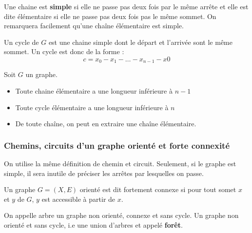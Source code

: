 \begin{definition}
    Une chaine est \textbf{simple} si elle ne passe pas deux fois par le même arrête et elle est dite élémentaire si elle ne passe pas deux fois pas le même sommet.
    On remarquera facilement qu'une chaîne élémentaire est simple.
\end{definition}

\begin{definition}[Cycle]
    Un cycle de $G$ est une chaine simple dont le départ et l'arrivée sont le même sommet. Un cycle est donc de la forme :
        \[ c = x_0 - x_1 - \dots - x_{n-1} - x0 \] 
\end{definition}

\begin{theorem}
    Soit $G$ un graphe.
    \begin{itemize}
        \item Toute chaine élémentaire a une longueur inférieure à $n-1$
        \item Toute cycle élémentaire a une longueur inférieure à $n$
        \item De toute chaîne, on peut en extraire une chaîne élémentaire.
    \end{itemize}
\end{theorem}


\subsubsection{Chemins, circuits d'un graphe orienté et forte connexité}

On utilise la même définition de chemin et circuit. Seulement, si le graphe est simple, il sera inutile de préciser les arrêtes par lesquelles on passe.

\begin{definition}
    Un graphe $G = (X,E)$ orienté est dit fortement connexe si pour tout somet $x$ et $y$ de $G$, $y$ est accessible à partir de $x$.
\end{definition}


\begin{definition}[Arbre]
    On appelle arbre un graphe non orienté, connexe et sans cycle. Un graphe non orienté et sans cycle, i.e une union d'arbres et appelé \textbf{forêt}.
\end{definition}

